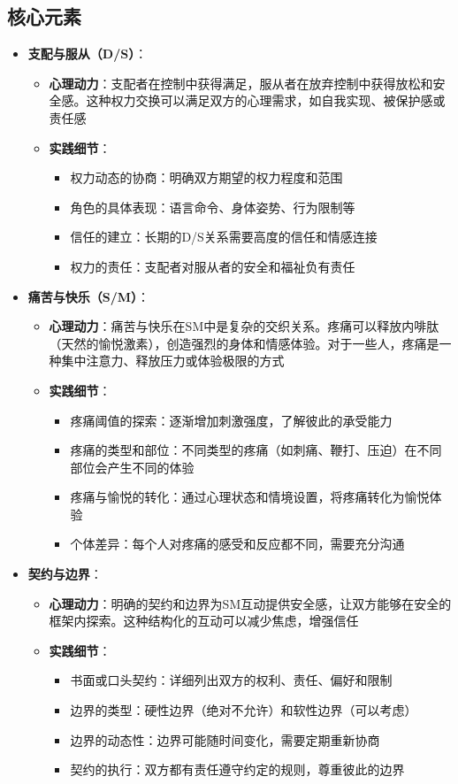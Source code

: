 \documentclass[12pt,UTF8]{ctexbook}
\begin{document}
\subsection{核心元素}
  \begin{itemize}
  \item \textbf{支配与服从（D/S）}：
    \begin{itemize}
    \item \textbf{心理动力}：支配者在控制中获得满足，服从者在放弃控制中获得放松和安全感。这种权力交换可以满足双方的心理需求，如自我实现、被保护感或责任感
    \item \textbf{实践细节}：
      \begin{itemize}
      \item 权力动态的协商：明确双方期望的权力程度和范围
      \item 角色的具体表现：语言命令、身体姿势、行为限制等
      \item 信任的建立：长期的D/S关系需要高度的信任和情感连接
      \item 权力的责任：支配者对服从者的安全和福祉负有责任
      \end{itemize}
    \end{itemize}
  \item \textbf{痛苦与快乐（S/M）}：
    \begin{itemize}
    \item \textbf{心理动力}：痛苦与快乐在SM中是复杂的交织关系。疼痛可以释放内啡肽（天然的愉悦激素），创造强烈的身体和情感体验。对于一些人，疼痛是一种集中注意力、释放压力或体验极限的方式
    \item \textbf{实践细节}：
      \begin{itemize}
      \item 疼痛阈值的探索：逐渐增加刺激强度，了解彼此的承受能力
      \item 疼痛的类型和部位：不同类型的疼痛（如刺痛、鞭打、压迫）在不同部位会产生不同的体验
      \item 疼痛与愉悦的转化：通过心理状态和情境设置，将疼痛转化为愉悦体验
      \item 个体差异：每个人对疼痛的感受和反应都不同，需要充分沟通
      \end{itemize}
    \end{itemize}
  \item \textbf{契约与边界}：
    \begin{itemize}
    \item \textbf{心理动力}：明确的契约和边界为SM互动提供安全感，让双方能够在安全的框架内探索。这种结构化的互动可以减少焦虑，增强信任
    \item \textbf{实践细节}：
      \begin{itemize}
      \item 书面或口头契约：详细列出双方的权利、责任、偏好和限制
      \item 边界的类型：硬性边界（绝对不允许）和软性边界（可以考虑）
      \item 边界的动态性：边界可能随时间变化，需要定期重新协商
      \item 契约的执行：双方都有责任遵守约定的规则，尊重彼此的边界
      \end{itemize}
    \end{itemize}
  \end{itemize}
\end{document}
